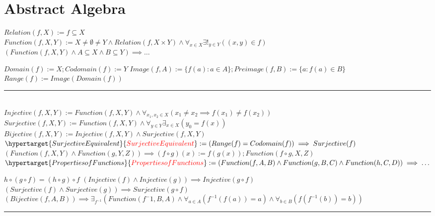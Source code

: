 \documentclass{book}
\newcommand{\df}[1]{\hypertarget{#1}{\textcolor{red}{#1}}}
\newcommand{\abr}{:=}
\newcommand{\pr}[1]{\left(#1\right)}
\begin{document}
\chapter{Abstract Algebra}
$Relation(f, X) \abr f \subseteq X$ \\
$Function(f, X, Y) \abr X \neq \emptyset \neq Y \land Relation(f, X \times Y) \land \forall_{x \in X} \exists!_{y \in Y}\pr{(x, y) \in f}$ \\

$\pr{Function(f, X, Y) \land A \subseteq X \land B \subseteq Y} \implies \ldots$
\begin{enumerate}
  \lit $Domain(f) \abr X; Codomain(f) \abr Y$ %
  \lit $Image(f, A) \abr \{f(a) : a \in A\}; Preimage(f, B) \abr \{a : f(a) \in B\}$
  \lit $Range(f) \abr Image\pr{Domain(f)}$
\end{enumerate} \vspace{.75mm} \hrule \vspace{.75mm} \ \\ 

$Injective(f, X, Y) \abr Function(f, X, Y) \land \forall_{x_1, x_2 \in X}\pr{x_1 \neq x_2 \implies f(x_1) \neq f(x_2)}$ \\ %
$Surjective(f, X, Y) \abr Function(f, X, Y) \land \forall_{y \in Y} \exists_{x \in X}\pr{y_0 = f(x)}$ \\ %
$Bijective(f, X, Y) \abr Injective(f, X, Y) \land Surjective(f, X, Y)$ \\ %
$\df{Surjective Equivalent} \abr \pr{Range(f) = Codomain(f)} \implies Surjective(f)$ \\

$\pr{Function(f, X, Y) \land Function(g, Y, Z)} \implies (f \circ g)(x) \abr f\pr{g(x)}; Function(f \circ g, X, Z)$ \\

$\df{Properties of Functions} \abr \pr{Function(f, A, B) \land Function(g, B, C) \land Function(h, C, D)} \implies \ldots$
\begin{enumerate}
  \lit $h \circ (g \circ f) = (h \circ g) \circ f$
  \lit $\pr{Injective(f) \land Injective(g)} \implies Injective(g \circ f)$
  \lit $\pr{Surjective(f) \land Surjective(g)} \implies Surjective(g \circ f)$
  \lit $\pr{Bijective(f, A, B)} \implies \exists_{f^{-1}}\pr{Function(f^-1, B, A) \land \forall_{a \in A}\pr{f^{-1}\pr{f(a)} = a} \land \forall_{b \in B}\pr{f\pr{f^{-1}(b)} = b}}$
\end{enumerate} \vspace{.75mm} \hrule \vspace{.75mm} \ \\ 
\end{document}
